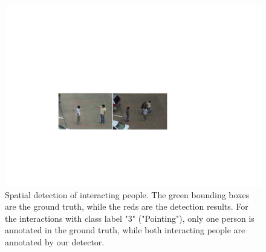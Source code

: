 \begin{figure}
	\includegraphics[trim=5cm 6cm 0cm 10cm]{fig01/label3.pdf}
	\caption{Spatial detection of interacting people. The green bounding boxes are the ground truth, while the reds are the detection results.  For the interactions with class label "3" ("Pointing"), only one person is annotated in the ground truth, while both interacting people are annotated by our detector. }
	\label{fig:label3}
\end{figure}
\par

